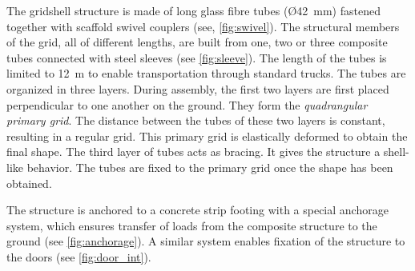 The gridshell structure is made of long glass fibre tubes (\O 42~mm) fastened together with scaffold swivel couplers (see, \cref{fig:swivel}). The structural members of the grid, all of different lengths, are built  from one, two or three composite tubes connected with steel sleeves (see \cref{fig:sleeve}). The length of the tubes is limited to 12~m to enable transportation through standard trucks. The tubes are organized in three layers. During assembly, the first two layers are first placed perpendicular to one another on the ground. They form the \emph{quadrangular primary grid}. The distance between the tubes of these two layers is constant, resulting in a regular grid. This primary grid is elastically deformed to obtain the final shape. The third layer of tubes acts as bracing. It gives the structure a shell-like behavior. The tubes are fixed to the primary grid once the shape has been obtained.

The structure is anchored to a concrete strip footing with a special anchorage system, which ensures transfer of loads from the composite structure to the ground (see \cref{fig:anchorage}). A similar system enables fixation of the structure to the doors (see \cref{fig:door_int}).

